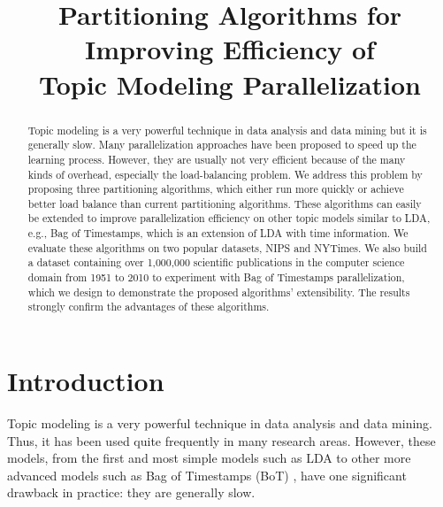 \documentclass[10pt,conference]{IEEEtran}
\begin{document}
\title{Partitioning Algorithms for Improving Efficiency of \\Topic Modeling Parallelization}

\author{
\and
{}
}

\maketitle

\begin{abstract}
Topic modeling is a very powerful technique in data analysis and data mining but it is generally slow. Many parallelization approaches have been proposed to speed up the learning process. However, they are usually not very efficient because of the many kinds of overhead, especially the load-balancing problem. We address this problem by proposing three partitioning algorithms, which either run more quickly or achieve better load balance than current partitioning algorithms. These algorithms can easily be extended to improve parallelization efficiency on other topic models similar to LDA, e.g., Bag of Timestamps, which is an extension of LDA with time information. We evaluate these algorithms on two popular datasets, NIPS and NYTimes. We also build a dataset containing over 1,000,000 scientific publications in the computer science domain from 1951 to 2010 to experiment with Bag of Timestamps parallelization, which we design to demonstrate the proposed algorithms' extensibility. The results strongly confirm the advantages of these algorithms.
\end{abstract}

\IEEEpeerreviewmaketitle

\section{Introduction}
Topic modeling is a very powerful technique in data analysis and data mining. Thus, it has been used quite frequently in many research areas. However, these models, from the first and most simple models such as LDA \cite{blei2003latent} to other more advanced models such as Bag of Timestamps (BoT) \cite{masada2009bag}, have one significant drawback in practice: they are generally slow.
\end{document}
